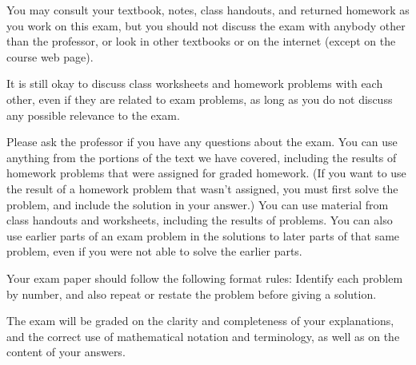 



\bigskip
You may consult your textbook, notes, class handouts, and returned
homework as you work on this exam, but you should not discuss the exam
with anybody other than the professor, or look in other textbooks or on the
internet (except on the course web page).

It is still okay to discuss class worksheets and homework problems with
each other, even if they are related to exam problems, as long as you do not
discuss any possible relevance to the exam.

Please ask the professor if you have any questions about the exam.
You can use anything from the portions of the text we have covered,
including the results of homework problems that were assigned for graded
homework. (If you want to use the result of a homework problem that wasn't
assigned, you must first solve the problem, and include the solution in your
answer.) You can use material from class handouts and worksheets, including
the results of problems. You can also use earlier parts of an exam problem in
the solutions to later parts of that same problem, even if you were not able
to solve the earlier parts.

Your exam paper should follow the following format rules: Identify each
problem by number, and also repeat or restate the problem before giving a
solution.

The exam will be graded on the clarity and completeness of your explanations,
and the correct use of mathematical notation and terminology, as
well as on the content of your answers.
